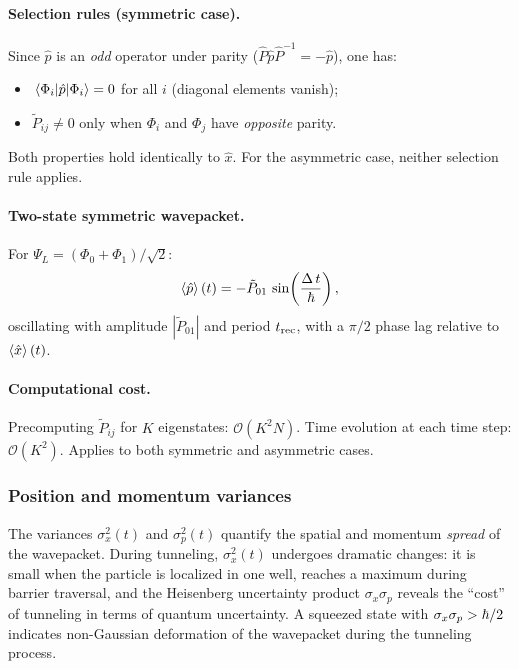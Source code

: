 \paragraph{Selection rules (symmetric case).}
Since $\hat{p}$ is an \emph{odd} operator under parity ($\hat{P}\hat{p}\hat{P}^{-1} = -\hat{p}$), one has:
\begin{itemize}
  \item $\mel{\Phi_i}{\hat{p}}{\Phi_i} = 0$ for all $i$ (diagonal elements vanish);
  \item $\tilde{P}_{ij} \neq 0$ only when $\Phi_i$ and $\Phi_j$ have \emph{opposite} parity.
\end{itemize}
Both properties hold identically to $\hat{x}$.
For the asymmetric case, neither selection rule applies.

\paragraph{Two-state symmetric wavepacket.}
For $\Psi_L = (\Phi_0 + \Phi_1)/\sqrt{2}$:
\begin{equation}
  \expval{\hat{p}}(t) = -\tilde{P}_{01}\,\sin\!\left(\frac{\Delta\,t}{\hbar}\right),
\end{equation}
oscillating with amplitude $|\tilde{P}_{01}|$ and period $t_{\text{rec}}$, with a $\pi/2$ phase lag relative to $\expval{\hat{x}}(t)$.

\paragraph{Computational cost.}
Precomputing $\tilde{P}_{ij}$ for $K$ eigenstates: $\mathcal{O}(K^2 N)$.
Time evolution at each time step: $\mathcal{O}(K^2)$.
Applies to both symmetric and asymmetric cases.

\subsubsection{Position and momentum variances}\label{sec:variances}

\begin{remark}
The variances $\sigma_x^2(t)$ and $\sigma_p^2(t)$ quantify the spatial and momentum \emph{spread} of the wavepacket.
During tunneling, $\sigma_x^2(t)$ undergoes dramatic changes: it is small when the particle is localized in one well, reaches a maximum during barrier traversal, and the Heisenberg uncertainty product $\sigma_x\sigma_p$ reveals the ``cost'' of tunneling in terms of quantum uncertainty.
A squeezed state with $\sigma_x\sigma_p > \hbar/2$ indicates non-Gaussian deformation of the wavepacket during the tunneling process.
\end{remark}

